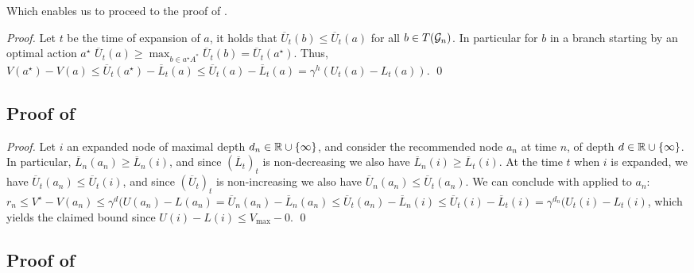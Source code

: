 \documentclass[runningheads]{llncs}
\begin{document}
Which enables us to proceed to the proof of .
\begin{proof}
	Let $t$ be the time of expansion of $a$, it holds that $\overline{U}_t(b) \leq \overline{U}_t(a)$ for all $b\in T(\mathcal{G}_n)$. In particular for $b$ in a branch starting by an optimal action $a^\star$ $\overline{U}_t(a) \geq \max_{b\in a^\star A^*}  \overline{U}_t(b) = \overline{U}_t(a^\star)$. Thus, $V(a^\star)-V(a) \leq \overline{U}_t(a^\star) - \overline{L}_t(a) \leq \overline{U}_t(a) - \overline{L}_t(a) = \gamma^h(U_t(a)-L_t(a))$.
\qed\end{proof}

\subsection{Proof of }
\begin{proof}
	Let $i$ an expanded node of maximal depth $d_n\in\mathbb{R}\cup\{\infty\}$, and consider the recommended node $a_n$ at time $n$, of depth $d\in\mathbb{R}\cup\{\infty\}$. In particular, $\overline{L}_n(a_n) \geq \overline{L}_n(i)$, and since $(\overline{L}_t)_t$ is non-decreasing we also have $\overline{L}_n(i) \geq \overline{L}_t(i)$. At the time $t$ when $i$ is expanded, we have $\overline{U}_t(a_n) \leq \overline{U}_t(i)$, and since $(\overline{U}_t)_t$ is non-increasing we also have $\overline{U}_n(a_n) \leq \overline{U}_t(a_n)$. We can conclude with  applied to $a_n$: $r_n \leq V^\star - V(a_n) \leq  \gamma^d(U(a_n)-L(a_n) = \overline{U}_n(a_n) - \overline{L}_n(a_n)  \leq \overline{U}_t(a_n) - \overline{L}_n(i) \leq \overline{U}_t(i) - \overline{L}_t(i) = \gamma^{d_n}(U_t(i) - L_t(i)$, which yields the claimed bound since $U(i) - L(i) \leq V_{\max}-0$.
\qed\end{proof}


\subsection{Proof of }
\end{document}
